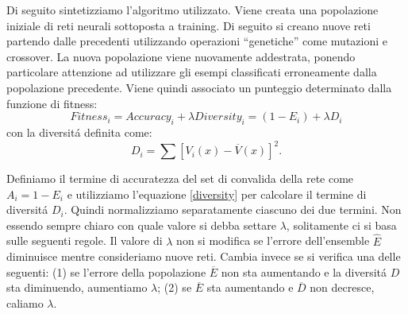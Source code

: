 \documentclass[a4paper,10pt]{article}
\begin{document}
  
  Di seguito sintetizziamo l'algoritmo utilizzato. Viene creata una popolazione iniziale di reti neurali sottoposta a training. Di seguito si creano nuove reti partendo dalle precedenti utilizzando operazioni ``genetiche'' come mutazioni e crossover. La nuova popolazione viene nuovamente addestrata, ponendo particolare attenzione ad utilizzare gli esempi classificati erroneamente dalla popolazione precedente. Viene quindi associato un punteggio determinato dalla funzione di fitness:
  \begin{equation}
   Fitness_i = Accuracy_i + \lambda Diversity_i = (1-E_i) + \lambda D_i \label{fitness}
  \end{equation}
  con la diversit\'a definita come:
  \begin{equation}
   D_i = \sum \left[ V_i \left(x\right) - \overline{V} \left(x\right) \right]^2. \label{diversity}
  \end{equation}
  
  Definiamo il termine di accuratezza del set di convalida della rete come $A_i = 1-E_i$ e utilizziamo l'equazione \ref{diversity} per calcolare il termine di diversit\'a $D_i$. Quindi normalizziamo separatamente ciascuno dei due termini. Non essendo sempre chiaro con quale valore si debba settare $\lambda$, solitamente ci si basa sulle seguenti regole. Il valore di $\lambda$ non si modifica se l'errore dell'ensemble $\widehat{E}$ diminuisce mentre consideriamo nuove reti. Cambia invece se si verifica una delle seguenti: (1) se l'errore della popolazione $\overline{E}$ non sta aumentando e la diversit\'a $D$ sta diminuendo, aumentiamo $\lambda$; (2) se $\overline{E}$ sta aumentando e $\overline{D}$ non decresce, caliamo $\lambda$.
  
\end{document}
